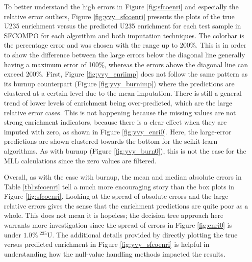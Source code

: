 To better understand the high errors in Figure \ref{fig:sfcoenri} and
especially the relative error outliers, Figure \ref{fig:yvy_sfcoenri} presents
the plots of the true \gls{U235} enrichment versus the predicted \gls{U235}
enrichment for each test sample in \gls{SFCOMPO} for each algorithm and both
imputation techniques.  The colorbar is the percentage error and was chosen
with the range up to 200\%.  This is in order to show the difference between
the large errors below the diagonal line generally having a maximum error of
100\%, whereas the errors above the diagonal line can exceed 200\%.  First,
Figure \ref{fig:yvy_enriimp} does not follow the same pattern as its burnup
counterpart (Figure \ref{fig:yvy_burnimp}) where the predictions are clustered
at a certain level due to the mean imputation.  There is still a general trend
of lower levels of enrichment being over-predicted, which are the large
relative error cases.  This is not happening because the missing values are not
strong enrichment indicators, because there is a clear effect when they are
imputed with zero, as shown in Figure \ref{fig:yvy_enri0}.  Here, the
large-error predictions are shown clustered towards the bottom for the
scikit-learn algorithms.  As with burnup (Figure \ref{fig:yvy_burn0}), this is
not the case for the \gls{MLL} calculations since the zero values are filtered. 

Overall, as with the case with burnup, the mean and median absolute errors in
Table \ref{tbl:sfcoenri} tell a much more encouraging story than the box plots
in Figure \ref{fig:sfcoenri}.  Looking at the spread of absolute errors and the
large relative errors gives the sense that the enrichment predictions are quite
poor as a whole. This does not mean it is hopeless; the decision tree approach
here warrants more investigation since the spread of errors in Figure
\ref{fig:enri0} is under $1.0\%\:{}^{235}\text{U}$. The additional details
provided by directly plotting the true versus predicted enrichment in Figure
\ref{fig:yvy_sfcoenri} is helpful in understanding how the null-value handling
methods impacted the results.


